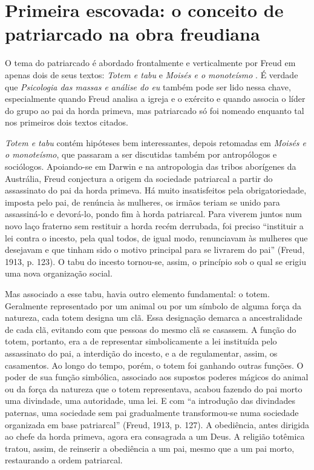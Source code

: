 \section{Primeira escovada: o conceito de patriarcado na obra freudiana}

O tema do patriarcado é abordado frontalmente e verticalmente por Freud
em apenas dois de seus textos: \emph{Totem e tabu} e \emph{Moisés e o
monoteísmo} . É verdade que \emph{Psicologia das massas e análise do eu}
também pode ser lido nessa chave, especialmente quando Freud analisa a
igreja e o exército e quando associa o líder do grupo ao pai da horda
primeva, mas patriarcado só foi nomeado enquanto tal nos primeiros dois
textos citados.

\emph{Totem e tabu} contém hipóteses bem interessantes, depois retomadas
em \emph{Moisés e o monoteísmo}, que passaram a ser discutidas também
por antropólogos e sociólogos. Apoiando-se em Darwin e na antropologia
das tribos aborígenes da Austrália, Freud conjectura a origem da
sociedade patriarcal a partir do assassinato do pai da horda primeva. Há
muito insatisfeitos pela obrigatoriedade, imposta pelo pai, de renúncia
às mulheres, os irmãos teriam se unido para assassiná-lo e devorá-lo,
pondo fim à horda patriarcal. Para viverem juntos num novo laço fraterno
sem restituir a horda recém derrubada, foi preciso ``instituir a lei
contra o incesto, pela qual todos, de igual modo, renunciavam às
mulheres que desejavam e que tinham sido o motivo principal para se
livrarem do pai'' (Freud, 1913, p. 123). O tabu do incesto tornou-se,
assim, o princípio sob o qual se erigiu uma nova organização social.

Mas associado a esse tabu, havia outro elemento fundamental: o totem.
Geralmente representado por um animal ou por um símbolo de alguma força
da natureza, cada totem designa um clã. Essa designação demarca a
ancestralidade de cada clã, evitando com que pessoas do mesmo clã se
casassem. A função do totem, portanto, era a de representar
simbolicamente a lei instituída pelo assassinato do pai, a interdição do
incesto, e a de regulamentar, assim, os casamentos. Ao longo do tempo,
porém, o totem foi ganhando outras funções. O poder de sua função
simbólica, associado aos supostos poderes mágicos do animal ou da força
da natureza que o totem representava, acabou fazendo do pai morto uma
divindade, uma autoridade, uma lei. E com ``a introdução das divindades
paternas, uma sociedade sem pai gradualmente transformou-se numa
sociedade organizada em base patriarcal'' (Freud, 1913, p. 127). A
obediência, antes dirigida ao chefe da horda primeva, agora era
consagrada a um Deus. A religião totêmica tratou, assim, de reinserir a
obediência a um pai, mesmo que a um pai morto, restaurando a ordem
patriarcal.

